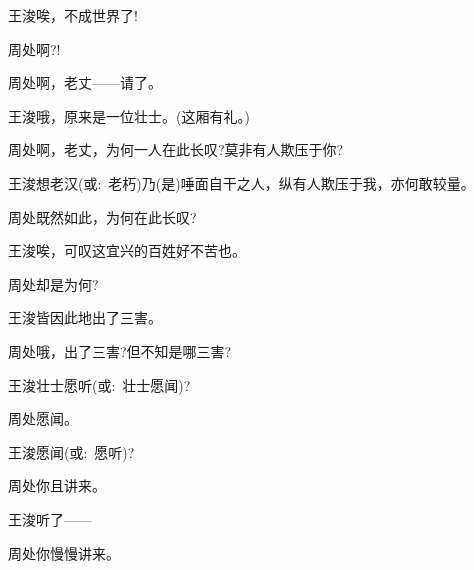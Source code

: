 {{{

{王浚}\hspace{30pt}唉，不成世界了!

周处\hspace{30pt}啊?!


周处\hspace{30pt}啊，老丈------请了。

{王浚}\hspace{30pt}哦，原来是一位壮士。(这厢有礼。)

{周处\hspace{30pt}啊，老丈，为何一人在此长叹?莫非有人欺压于你?}

{王浚}\hspace{30pt}想老汉({\akai 或}:~老朽)乃(是)唾面自干之人，纵有人欺压于我，亦何敢较量。

{周处\hspace{30pt}既然如此，为何在此长叹?}

{王浚\hspace{30pt}唉，可叹这宜兴的百姓好不苦也。}

{周处\hspace{30pt}却是为何?}

王浚\hspace{30pt}皆因此地出了三害。

{周处\hspace{30pt}哦，出了三害?但不知是哪三害?}

王浚\hspace{30pt}壮士愿听({\akai 或}:~壮士愿闻)?

{周处\hspace{30pt}愿闻。}

王浚\hspace{30pt}愿闻({\akai 或}:~愿听)?

{周处\hspace{30pt}你且讲来。}

{王浚}\hspace{30pt}听了------


{周处\hspace{30pt}你慢慢讲来。}

}}}
